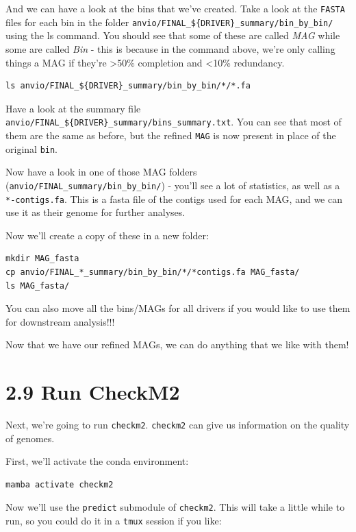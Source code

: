 \documentclass[
]{book}
\begin{document}
And we can have a look at the bins that we've created. Take a look at the \texttt{FASTA} files for each bin in the folder \texttt{anvio/FINAL\_\$\{DRIVER\}\_summary/bin\_by\_bin/} using the ls command. You should see that some of these are called \emph{MAG} while some are called \emph{Bin} - this is because in the command above, we're only calling things a MAG if they're \textgreater50\% completion and \textless10\% redundancy.

\begin{verbatim}
ls anvio/FINAL_${DRIVER}_summary/bin_by_bin/*/*.fa
\end{verbatim}

Have a look at the summary file \texttt{anvio/FINAL\_\$\{DRIVER\}\_summary/bins\_summary.txt}. You can see that most of them are the same as before, but the refined \texttt{MAG} is now present in place of the original \texttt{bin}.

Now have a look in one of those MAG folders (\texttt{anvio/FINAL\_summary/bin\_by\_bin/}) - you'll see a lot of statistics, as well as a \texttt{*-contigs.fa}. This is a fasta file of the contigs used for each MAG, and we can use it as their genome for further analyses.

Now we'll create a copy of these in a new folder:

\begin{verbatim}
mkdir MAG_fasta
cp anvio/FINAL_*_summary/bin_by_bin/*/*contigs.fa MAG_fasta/
ls MAG_fasta/
\end{verbatim}

You can also move all the bins/MAGs for all drivers if you would like to use them for downstream analysis!!!

Now that we have our refined MAGs, we can do anything that we like with them!

\section{2.9 Run CheckM2}\label{run-checkm2}

Next, we're going to run \texttt{checkm2}. \texttt{checkm2} can give us information on the quality of genomes.

First, we'll activate the conda environment:

\begin{verbatim}
mamba activate checkm2
\end{verbatim}

Now we'll use the \texttt{predict} submodule of \texttt{checkm2}. This will take a little while to run, so you could do it in a \texttt{tmux} session if you like:
\end{document}
